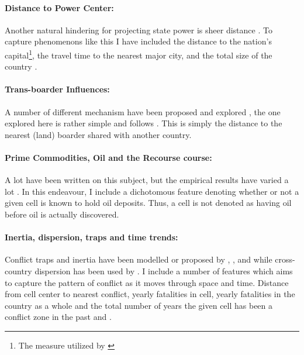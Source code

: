 \documentclass[a4paper]{article}
\begin{document}
\paragraph{Distance to Power Center:} Another natural hindering for projecting state power is sheer distance \citep{Fearon_2004, Buhaug_Gates_Lujala_2009, Cederman_Buhaug_Roed_2009, Buhaug_2010}. To capture phenomenons like this I have included the distance to the nation's capital\footnote{The measure utilized by \cite{Buhaug_2010}}, the travel time to the nearest major city, and the total size of the country \citep{prio_code_2015}.\par

\paragraph{Trans-boarder Influences:} A number of different mechanism have been proposed and explored \citep[29-30]{Blattman_Miguel_2010}, the one explored here is rather simple and follows \cite{Hegre_Sambanis_2006}. This is simply the distance to the nearest (land) boarder shared with another country.\par 

\paragraph{Prime Commodities, Oil and the Recourse course:} A lot have been written on this subject, but the empirical results have varied a lot \citep{Collier_Hoeffler_1998, Fearon_Laitin_2003, Fearon_2004, Ross_2004, Collier_Hoeffler_2004, Fearon_2005, Buhaug_2010, Hegre_Oestby_Raleigh_2009}. In this endeavour, I include a dichotomous feature denoting whether or not a given cell is known to hold oil deposits. Thus, a cell is not denoted as having oil before oil is actually discovered.\par

\paragraph{Inertia, dispersion, traps and time trends:} Conflict traps and inertia have been modelled or proposed by \cite{Collier_Hoeffler_2004}, \cite{Hegre_Sambanis_2006}, \cite{perry_2013} and \cite{Cederman_Gleditsch_Buhaug_2013} while cross-country dispersion has been used by \cite{Goldstone_2010}. I include a number of features which aims to capture the pattern of conflict as it moves through space and time. Distance from cell center to nearest conflict, yearly fatalities in cell, yearly fatalities in the country as a whole and the total number of years the given cell has been a conflict zone in the past and .\par
\end{document}
